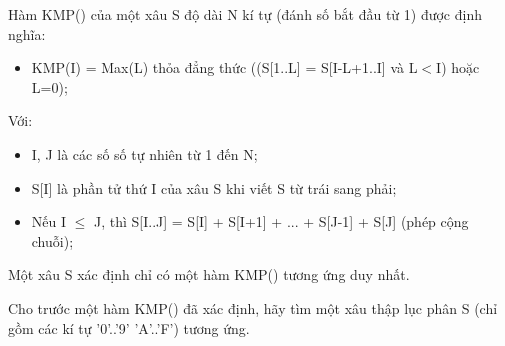Hàm KMP() của một xâu S độ dài N kí tự (đánh số bắt đầu từ 1) được định nghĩa:  
\begin{itemize}
	\item     KMP(I) = Max(L) thỏa đẳng thức ((S[1..L] = S[I-L+1..I] và L$<$I) hoặc L=0);   
\end{itemize}

   Với:  
\begin{itemize}
	\item     I, J là các số số tự nhiên từ 1 đến N;   
	\item     S[I] là phần tử thứ I của xâu S khi viết S từ trái sang phải;   
	\item     Nếu I $\le$ J, thì S[I..J] = S[I] + S[I+1] + ... + S[J-1] + S[J] (phép cộng chuỗi);   
\end{itemize}

   Một xâu S xác định chỉ có một hàm KMP() tương ứng duy nhất.  

   Cho trước một hàm KMP() đã xác định, hãy tìm một xâu thập lục phân S (chỉ gồm các kí tự '0'..'9' 'A'..'F') tương ứng.  

\
